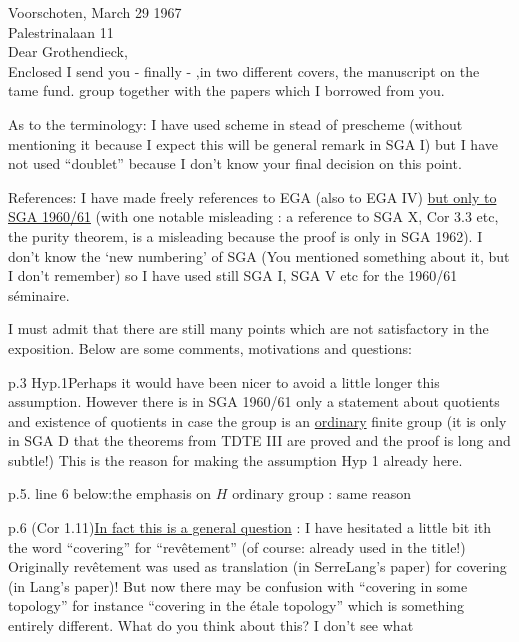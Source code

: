 Voorschoten, March 29 1967\\
Palestrinalaan 11\\

Dear Grothendieck,\\

Enclosed I send you - finally - ,in two different covers, the manuscript on the tame fund. group together with the papers which I borrowed from you.

As to the terminology: I have used scheme in stead of prescheme (without mentioning it because I expect this will be  general remark in SGA I) but I have not used ``doublet'' because I don't know your final decision on this point.

References: I have made freely references to EGA (also to EGA IV) \uline{but only to SGA 1960/61} (with one notable misleading : a reference to SGA X, Cor 3.3 etc, the purity theorem, is a misleading because the proof is only in SGA 1962). I don't know the `new numbering' of SGA (You mentioned something about it, but I don't remember) so I have used still SGA I, SGA V etc for the 1960/61 séminaire.

I must admit that there are still many points which are not satisfactory in the exposition. Below are some comments, motivations and questions:

p.3 Hyp.1\quad Perhaps it would have been nicer to avoid a little longer this assumption. However there is in SGA 1960/61 only a statement about quotients and existence of quotients in case the group is an \uline{ordinary} finite group (it is only in SGA D that the theorems from TDTE III are proved and the proof is long and subtle!) This is the reason for making the assumption Hyp 1 already here.

p.5. line 6 below:\quad the emphasis on $H$ ordinary group : same reason

p.6 (Cor 1.11)\quad \uline{In fact this is a general question} : I have hesitated a little bit ith the word ``covering'' for ``revêtement'' (of course: already used in the title!)
Originally revêtement was used as translation  (in SerreLang's paper) for covering (in Lang's paper)! But now there may be confusion with ``covering in some topology'' for instance ``covering in the étale topology'' which is something entirely different. What do you think about this? I don't see what
